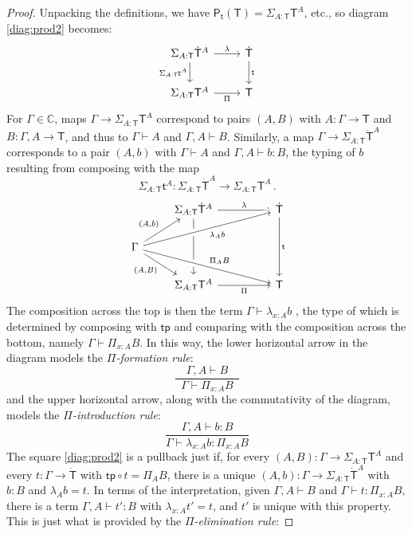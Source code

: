 \documentclass[12pt,reqno]{amsart}
\newcommand{\C}{\ensuremath{\mathbb{C}}}
\newcommand{\tp}{\ensuremath{\mathsf{tp}}}
\newcommand{\alg}[1]{\ensuremath{\mathsf{#1}}}
\renewcommand{\to}{\ensuremath{\rightarrow}}
\newcommand{\G}{\ensuremath{\Gamma}}
\newcommand{\ext}[2]{{#1,#2}}
\renewcommand{\t}{\ensuremath{\mathsf{t}}}
\newcommand{\T}{\ensuremath{\mathsf{T}}}
\newcommand{\TT}{\ensuremath{\dot{\mathsf{T}}}}
\theoremstyle{remark}
\theoremstyle{definition}
\begin{document}
\begin{proof}
Unpacking the definitions, we have $\alg{P}_\t(\T) = \Sigma_{A:\T} \T^A $, etc.,  
so diagram \eqref{diag:prod2} becomes:
\begin{equation*}%
\begin{tikzcd}
\Sigma_{A:\T} \TT^A \ar[d,swap, "{\Sigma_{A:\T} \t^A}"]  \ar[r, "{\lambda}"] &  \TT \ar[d,"{\t}"] \\
\Sigma_{A:\T} \T^A    \ar[r, swap,"{\Pi}"] & \T
\end{tikzcd}
\end{equation*}
For $\G \in \C$, maps $\G\to \Sigma_{A:\T} \T^A $ correspond to pairs $(A,B)$ with  $A:\G\to \T$ and $B : \ext{\G}{A} \to \T$, and thus to $\G\vdash A$ and $\ext{\G}{A} \vdash B$. Similarly, a map $\G\to \Sigma_{A:\T} \TT^A $ corresponds to a pair $(A,b)$ with $\G\vdash A$ and $\ext{\G}{A} \vdash b : B$, the typing of $b$ resulting from composing with the map 
\[
\Sigma_{A:\T} \t^A : \Sigma_{A:\T} \TT^A \to \Sigma_{A:\T} \T^A\,.
\]
\begin{equation*}%
\begin{tikzcd}
	& \Sigma_{A:\T} \TT^A \ar[dd]  \ar[rr, "{\lambda}"] &&  \TT \ar[dd,"{\t}"] \\
\G \ar[dr,swap, "{(A,B)}"] \ar[ru, "{(A,b)}"] \ar[urrr, swap, crossing over, "{ \lambda_{A}b }"] \ar[drrr, crossing over, "{ \Pi_{A}B }"] &&& \\
 	& \Sigma_{A:\T}\T^A    \ar[rr, swap,"{\Pi}"] && \T 
\end{tikzcd}
\end{equation*}
The composition across the top is then the term $\G \vdash \lambda_{x:A} b$ , the type of which is determined by composing with $\tp$ and comparing with the composition across the bottom, namely $\G \vdash \Pi_{x:A} B$. In this way, the lower horizontal arrow in the diagram models the \emph{$\Pi$-formation rule}:
\[
\frac{\quad\ext{\G}{A}\vdash B\quad}{\G\vdash \Pi_{x:A} B}
\]
and the upper horizontal arrow, along with the commutativity of the diagram, models the \emph{$\Pi$-introduction rule}:
\[
\frac{\ext{\G}{A}\vdash b:B}{\G\vdash \lambda_{x:A} b : \Pi_{x:A} B}
\]
The square \eqref{diag:prod2} is a pullback just if, for every $(A,B) : \G \to \Sigma_{A:\T}\T^A$ and every $t: \G \to \TT$ with $\tp \circ t = \Pi_A B$, there is a unique $(A,b) : \G \to \Sigma_{A:\T}\TT^A$ with $b:B$ and $\lambda_A b = t$.  In terms of the interpretation, given $\ext{\G}{A} \vdash B$ and $\G\vdash t: \Pi_{x:A} B$, there is a term $\ext{\G}{A}\vdash t':B$ with $\lambda_{x:A}  t' = t$, and $t'$ is unique with this property.  This is just what is provided by the \emph{$\Pi$-elimination rule}:

\end{proof}
\end{document}

